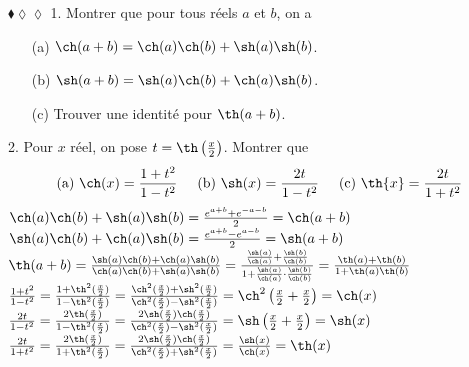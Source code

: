 \documentclass[11pt]{article}
\begin{document}
\begin{exercice}{$\blacklozenge\lozenge\lozenge$}{}
    1. Montrer que pour tous réels $a$ et $b$, on a
    \begin{itemize}
        \item[(a)] $\ch(a+b)=\ch(a)\ch(b)+\sh(a)\sh(b)$.
        \item[(b)] $\sh(a+b)=\sh(a)\ch(b)+\ch(a)\sh(b)$.
        \item[(c)] Trouver une identité pour $\th(a+b)$.
    \end{itemize}
    2. Pour $x$ réel, on pose $t=\th\left(\frac{x}{2}\right)$. Montrer que
    \begin{equation*}
        \text{(a) } \ch(x)=\frac{1+t^2}{1-t^2} \hspace{0.5cm} \text{(b) } \sh(x)=\frac{2t}{1-t^2} \hspace{0.5cm} \text{(c) } \th{x}=\frac{2t}{1+t^2}
    \end{equation*}
    \tcblower
     $\ch(a)\ch(b)+\sh(a)\sh(b)=\frac{e^{a+b}+e^{-a-b}}{2}=\ch(a+b)$\n
     $\sh(a)\ch(b)+\ch(a)\sh(b)=\frac{e^{a+b}-e^{a-b}}{2}=\sh(a+b)$\n
     $\th(a+b)=\frac{\sh(a)\ch(b)+\ch(a)\sh(b)}{\ch(a)\ch(b)+\sh(a)\sh(b)}=\frac{\frac{\sh(a)}{\ch(a)}+\frac{\sh(b)}{\ch(b)}}{1+\frac{\sh(a)}{\ch(a)}\cdot\frac{\sh(b)}{\ch(b)}}=\frac{\th(a)+\th(b)}{1+\th(a)\th(b)}$\n
     $\frac{1+t^2}{1-t^2}=\frac{1+\th^2(\frac{x}{2})}{1-\th^2(\frac{x}{2})}=\frac{\ch^2(\frac{x}{2})+\sh^2(\frac{x}{2})}{\ch^2(\frac{x}{2})-\sh^2(\frac{x}{2})}=\ch^2\left(\frac{x}{2}+\frac{x}{2}\right)=\ch(x)$\n
     $\frac{2t}{1-t^2}=\frac{2\th(\frac{x}{2})}{1-\th^2(\frac{x}{2})}=\frac{2\sh(\frac{x}{2})\ch(\frac{x}{2})}{\ch^2(\frac{x}{2})-\sh^2(\frac{x}{2})}=\sh\left(\frac{x}{2}+\frac{x}{2}\right)=\sh(x)$\n
     $\frac{2t}{1+t^2}=\frac{2\th(\frac{x}{2})}{1+\th^2(\frac{x}{2})}=\frac{2\sh(\frac{x}{2})\ch(\frac{x}{2})}{\ch^2(\frac{x}{2})+\sh^2(\frac{x}{2})}=\frac{\sh(x)}{\ch(x)}=\th(x)$
\end{exercice}

\pagebreak
\end{document}
